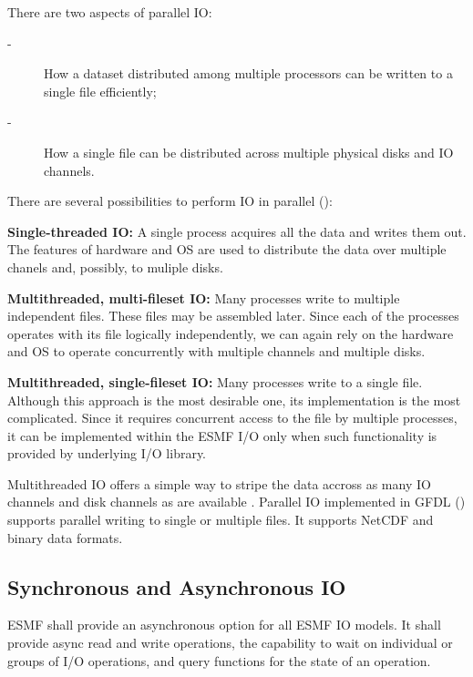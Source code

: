 There are two aspects of  parallel IO:

\begin{description}
\item[-] How a dataset distributed among multiple processors can be
written to a single file efficiently;

\item[-] How a single file can be distributed across multiple physical
disks and IO channels.
\end{description}
 
There are several possibilities to perform IO in parallel (\cite{MPI-2}):
\begin{description}
\item {\bf Single-threaded IO:} A single process acquires all the data and
writes them out. The features of hardware and OS are used to distribute the 
data over multiple chanels and, possibly, to muliple disks.

\item {\bf Multithreaded, multi-fileset IO:} Many processes write to
multiple independent files. These files may be assembled later. Since each of 
the processes operates with its file logically independently, we can again 
rely on the hardware and OS to operate concurrently with multiple channels and 
multiple disks. 
 
\item {\bf Multithreaded, single-fileset IO:} Many processes write to a
single file. Although this approach is the most desirable one, its 
implementation is the most complicated. Since it requires concurrent access 
to the file by multiple processes, it can be implemented within the ESMF I/O 
only when such functionality is provided by underlying I/O library. 
\end{description}

Multithreaded IO offers a simple way to stripe the data accross as many
IO channels and disk channels as are available \cite{MPI-2, 
Balaji_Parallel_IO_1999, Balaji_Parallel_IO_2000}. Parallel IO implemented in 
GFDL (\cite{mpp_io}) supports parallel writing to single or multiple files. 
It supports NetCDF and binary data formats.

\subsection{Synchronous and Asynchronous IO}

ESMF shall provide an asynchronous option for all ESMF IO models.  It
shall provide async read and write operations, the capability to wait
on individual or groups of I/O operations, and query functions for the
state of an operation.


